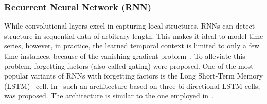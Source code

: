 \subsubsection{Recurrent Neural Network (RNN)}%
While convolutional layers excel in capturing local structures, RNNs can detect structure in sequential data of arbitrary length.
This makes it ideal to model time series, however, in practice, the learned temporal context is limited to only a few time instances, because of the vanishing gradient problem~\cite{Hochreiter98}.
To alleviate this problem, forgetting factors (also called gating) were proposed.
One of the most popular variants of RNNs with forgetting factors is the Long Short-Term Memory (LSTM)~\cite{Hochreiter97} cell.
In~\cite{stoeter17} such an architecture based on three bi-directional LSTM cells, was proposed. The architecture is similar to the one employed in~\cite{Leglaive15}.


%

